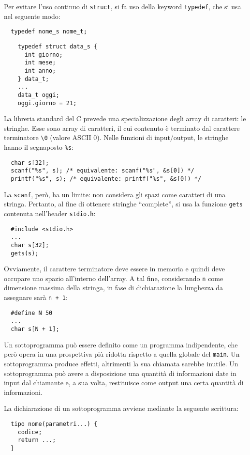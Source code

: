 Per evitare l'uso continuo di \verb|struct|, si fa uso della keyword \verb|typedef|, che si usa nel seguente modo:
\begin{verbatim}
  typedef nome_s nome_t;
\end{verbatim}

\begin{example}
  \begin{verbatim}
    typedef struct data_s {
      int giorno;
      int mese;
      int anno;
    } data_t;
    ...
    data_t oggi;
    oggi.giorno = 21;
  \end{verbatim}
\end{example}

La libreria standard del C prevede una specializzazione degli array di caratteri: le stringhe. Esse sono array di caratteri, il cui contenuto è terminato dal carattere terminatore \verb|\0| (valore ASCII 0). Nelle funzioni di input/output, le stringhe hanno il segnaposto \verb|%s|:
\begin{verbatim}
  char s[32];
  scanf("%s", s); /* equivalente: scanf("%s", &s[0]) */
  printf("%s", s); /* equivalente: printf("%s", &s[0]) */
\end{verbatim}

La \verb|scanf|, però, ha un limite: non considera gli spazi come caratteri di una stringa. Pertanto, al fine di ottenere stringhe ``complete'', si usa la funzione \verb|gets| contenuta nell'header \verb|stdio.h|:
\begin{verbatim}
  #include <stdio.h>
  ...
  char s[32];
  gets(s);
\end{verbatim}

Ovviamente, il carattere terminatore deve essere in memoria e quindi deve occupare uno spazio all'interno dell'array. A tal fine, considerando \verb|n| come dimensione massima della stringa, in fase di dichiarazione la lunghezza da assegnare sarà \verb|n + 1|:
\begin{verbatim}
  #define N 50
  ...
  char s[N + 1];
\end{verbatim}

Un sottoprogramma può essere definito come un programma indipendente, che però opera in una prospettiva più ridotta rispetto a quella globale del \verb|main|.
Un sottoprogramma produce effetti, altrimenti la sua chiamata sarebbe inutile.
Un sottoprogramma può avere a disposizione una quantità di informazioni date in input dal chiamante e, a sua volta, restituisce come output una certa quantità di informazioni.

La dichiarazione di un sottoprogramma avviene mediante la seguente scrittura:
\begin{verbatim}
  tipo nome(parametri...) {
    codice;
    return ...;
  }
\end{verbatim}

